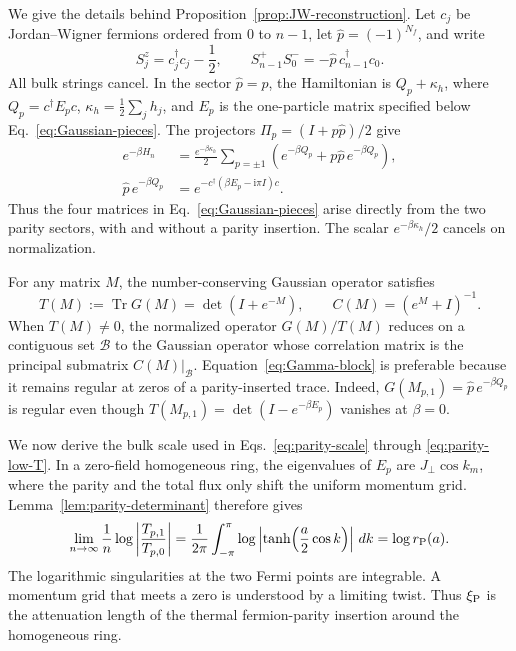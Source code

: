 \documentclass[11pt]{article}
\newcommand{\Tr}{\operatorname{Tr}}
\newcommand{\ii}{\mathrm{i}}
\begin{document}
We give the details behind Proposition~\ref{prop:JW-reconstruction}.  Let
$c_j$ be Jordan--Wigner fermions ordered from $0$ to $n-1$, let
$\widehat p=(-1)^{N_f}$, and write
\begin{equation}
 S_j^z=c_j^\dagger c_j-\frac12,
 \qquad
 S_{n-1}^+S_0^-=-\widehat p\,c_{n-1}^\dagger c_0.
 \label{eq:JW-boundary}
\end{equation}
All bulk strings cancel.  In the sector $\widehat p=p$, the Hamiltonian is
$Q_p+\kappa_h$, where $Q_p=c^\dagger E_pc$,
$\kappa_h=\frac12\sum_jh_j$, and $E_p$ is the one-particle matrix specified below
Eq.~\eqref{eq:Gaussian-pieces}.  The projectors
$\Pi_p=(I+p\widehat p)/2$ give
\begin{align}
 e^{-\beta H_n}
 &=\frac{e^{-\beta\kappa_h}}2\sum_{p=\pm1}
 \left(e^{-\beta Q_p}+p\widehat p\,e^{-\beta Q_p}\right),
 \label{eq:parity-projectors}\\
 \widehat p\,e^{-\beta Q_p}
 &=e^{-c^\dagger(\beta E_p-\ii\pi I)c}.
 \label{eq:parity-insertion}
\end{align}
Thus the four matrices in Eq.~\eqref{eq:Gaussian-pieces} arise directly from
the two parity sectors, with and without a parity insertion.  The scalar
$e^{-\beta\kappa_h}/2$ cancels on normalization.

For any matrix $M$, the number-conserving Gaussian operator satisfies
\begin{equation}
 T(M):=\Tr G(M)=\det(I+e^{-M}),
 \qquad C(M)=(e^M+I)^{-1}.
 \label{eq:Gaussian-trace}
\end{equation}
When $T(M)\ne0$, the normalized operator $G(M)/T(M)$ reduces on a contiguous
set $\mathcal B$ to the Gaussian operator whose correlation matrix is the
principal submatrix $C(M)|_{\mathcal B}$.  Equation~\eqref{eq:Gamma-block}
is preferable because it remains regular at zeros of a parity-inserted
trace.  Indeed, $G(M_{p,1})=\widehat p\,e^{-\beta Q_p}$ is regular even
though $T(M_{p,1})=\det(I-e^{-\beta E_p})$ vanishes at $\beta=0$.

We now derive the bulk scale used in
Eqs.~\eqref{eq:parity-scale} through \eqref{eq:parity-low-T}.  In a zero-field
homogeneous ring, the eigenvalues of $E_p$ are
$J_\perp\cos k_m$, where the parity and the total flux only shift the
uniform momentum grid.  Lemma~\ref{lem:parity-determinant} therefore gives
\begin{equation}
 \lim_{n\to\infty}\frac1n
 \log\left|\frac{T_{p,1}}{T_{p,0}}\right|
 =\frac1{2\pi}\int_{-\pi}^{\pi}
 \log\left|\tanh\!\left(\frac a2\cos k\right)\right|\,dk
 =\log r_{\rm P}(a).
 \label{eq:parity-bulk-limit}
\end{equation}
The logarithmic singularities at the two Fermi points are integrable.  A
momentum grid that meets a zero is understood by a limiting twist.  Thus
$\xi_{\rm P}$ is the attenuation length of the thermal fermion-parity
insertion around the homogeneous ring.
\end{document}
